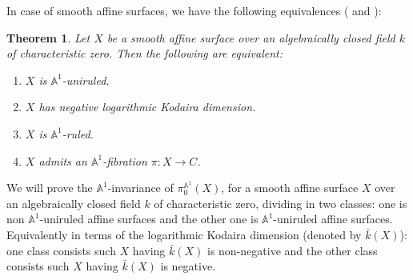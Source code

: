 \documentclass[11pt, reqno]{amsart}
\theoremstyle{plain}
\newtheorem{theorem}[thm]{Theorem}
\theoremstyle{definition}
\newtheorem{remark}[thm]{Remark}
\newcommand{\A}{{\mathbb A}}
\newcommand{\C}{{\mathbb C}}
\begin{document}
In case of smooth affine surfaces, we have the following equivalences
(\cite[Chapter 2, Theorem 2.1.1 and Chapter 3, Lemma 1.3.1]{miyanishicrm} and \cite[Lemma 1.8]{russell}):
\begin{theorem} \label{all uniruled equivalences}
Let $X$ be a smooth affine surface over an algebraically closed field $k$ of characteristic zero.
Then 
the following are equivalent:
\begin{enumerate}
	\item $X$ is $\mathbb{A}^1$-uniruled.
	\item $X$ has negative logarithmic Kodaira dimension.
	\item $X$ is $\mathbb{A}^1$-ruled.
	\item $X$ admits an $\mathbb{A}^1$-fibration $\pi: X \to C$.
\end{enumerate}
\end{theorem}
We will prove the $\A^1$-invariance of $\pi_0^{\A^1}(X)$, for a smooth affine surface $X$ over an algebraically closed field $k$ of characteristic zero, dividing in two classes: one is non $\A^1$-uniruled affine surfaces and the other one is $\A^1$-uniruled affine surfaces. Equivalently in terms of the logarithmic Kodaira dimension (denoted by $\bar{k}(X)$): one class consists such $X$ having $\bar{k}(X)$ is non-negative 
and the other class consists such $X$ having $\bar{k}(X)$ is negative.
\end{document}
